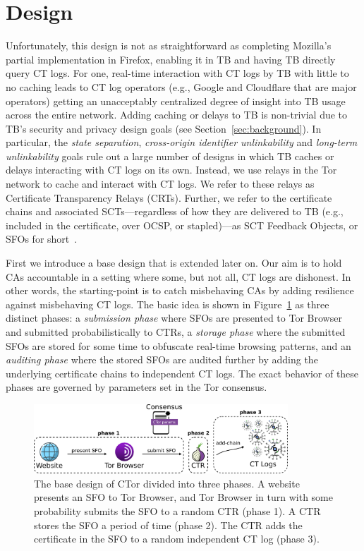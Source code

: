 \section{Design} \label{sec:base}
Unfortunately, this design is not as straightforward as completing Mozilla's
partial implementation in Firefox, enabling it in TB and having TB directly
query CT logs. For one, real-time interaction with CT logs by TB with little to
no caching leads to CT log operators (e.g., Google and Cloudflare that are major
operators) getting an unacceptably centralized degree of insight into TB usage
across the entire network. Adding caching or delays to TB is non-trivial due to
TB's security and privacy design goals (see Section~\ref{sec:background}). In
particular, the \emph{state separation},
\emph{cross-origin identifier unlinkability} and \emph{long-term unlinkability}
goals rule out a large number of designs in which TB caches or delays
interacting with CT logs on its own. Instead, we use relays in the Tor network
to cache and interact with CT logs. We refer to these relays as Certificate
Transparency Relays (CRTs). Further, we refer to the certificate chains and
associated SCTs---regardless of how they are delivered to TB (e.g., included in
the certificate, over OCSP, or stapled)---as SCT Feedback Objects, or SFOs for
short~\cite{nordberg}.

First we introduce a base design that is extended later on.  Our aim is to hold
CAs accountable in a setting where some, but not all, CT logs are dishonest.  In
other words, the starting-point is to catch misbehaving CAs by adding resilience
against misbehaving CT logs.  The basic idea is shown in
Figure~\ref{fig:design-ca} as three distinct phases: a \emph{submission phase}
where SFOs are presented to Tor Browser and submitted probabilistically to CTRs,
a \emph{storage phase} where the submitted SFOs are stored for some time to
obfuscate real-time browsing patterns, and an \emph{auditing phase} where the
stored SFOs are audited further by adding the underlying certificate chains to
independent CT logs. The exact behavior of these phases are governed by
parameters set in the Tor consensus.

\begin{figure}
	\centering
	\includegraphics[width=0.85\textwidth]{img/design-ca}
	\caption{%
		The base design of CTor divided into three phases. A website presents an
		SFO to Tor Browser, and Tor Browser in turn with some probability
		submits the SFO to a random CTR (phase 1). A CTR stores the SFO a period
		of time (phase 2). The CTR adds the certificate in the SFO to a random
		independent CT log (phase 3).
	}
	\label{fig:design-ca}
\end{figure}

